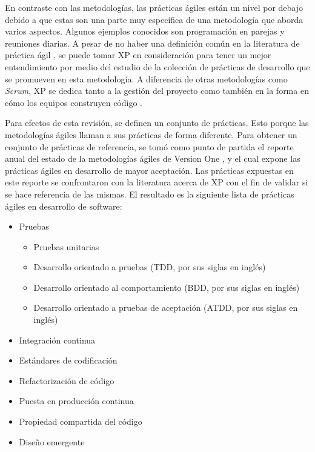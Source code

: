\documentclass[journal]{IEEEtran}
\begin{document}
En contraste con las metodologías, las prácticas ágiles están un nivel por debajo debido a que estas son una parte muy específica de una metodología que aborda varios aspectos. Algunos ejemplos conocidos son programación en parejas y reuniones diarias. A pesar de no haber una definición común en la literatura de práctica ágil \cite{diebold-dahlem}, se puede tomar XP en consideración para tener un mejor entendimiento por medio del estudio de la colección de prácticas de desarrollo que se promueven en esta metodología. A diferencia de otras metodologías como \emph{Scrum}, XP se dedica tanto a la gestión del proyecto como también en la forma en cómo los equipos construyen código \cite{shore-warden}.

Para efectos de esta revisión, se definen un conjunto de prácticas. Esto porque las metodologías ágiles llaman a sus prácticas de forma diferente. Para obtener un conjunto de prácticas de referencia, se tomó como punto de partida el reporte anual del estado de la metodologías ágiles de Version One \cite{version-one}, y el cual expone las prácticas ágiles en desarrollo de mayor aceptación. Las prácticas expuestas en este reporte se confrontaron con la literatura acerca de XP \cite{beck-andres, ford, shore-warden} con el fin de validar si se hace referencia de las mismas. El resultado es la siguiente lista de prácticas ágiles en desarrollo de software:
\begin{itemize}
    \item Pruebas
        \begin{itemize}
            \item Pruebas unitarias
            \item Desarrollo orientado a pruebas (TDD, por sus siglas en inglés)
            \item Desarrollo orientado al comportamiento (BDD, por sus siglas en inglés)
            \item Desarrollo orientado a pruebas de aceptación (ATDD, por sus siglas en inglés)
        \end{itemize}
        \item Integración continua
        \item Estándares de codificación
        \item Refactorización de código
        \item Puesta en producción continua
        \item Propiedad compartida del código
        \item Diseño emergente
\end{itemize}
\end{document}
